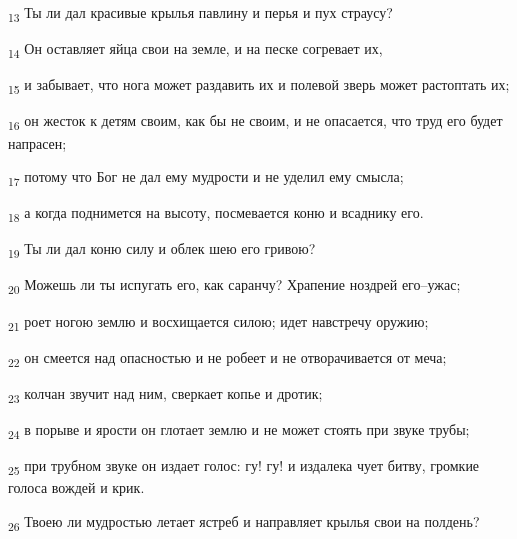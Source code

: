 \begin{tcolorbox}
\textsubscript{13} Ты ли дал красивые крылья павлину и перья и пух страусу?
\end{tcolorbox}
\begin{tcolorbox}
\textsubscript{14} Он оставляет яйца свои на земле, и на песке согревает их,
\end{tcolorbox}
\begin{tcolorbox}
\textsubscript{15} и забывает, что нога может раздавить их и полевой зверь может растоптать их;
\end{tcolorbox}
\begin{tcolorbox}
\textsubscript{16} он жесток к детям своим, как бы не своим, и не опасается, что труд его будет напрасен;
\end{tcolorbox}
\begin{tcolorbox}
\textsubscript{17} потому что Бог не дал ему мудрости и не уделил ему смысла;
\end{tcolorbox}
\begin{tcolorbox}
\textsubscript{18} а когда поднимется на высоту, посмевается коню и всаднику его.
\end{tcolorbox}
\begin{tcolorbox}
\textsubscript{19} Ты ли дал коню силу и облек шею его гривою?
\end{tcolorbox}
\begin{tcolorbox}
\textsubscript{20} Можешь ли ты испугать его, как саранчу? Храпение ноздрей его--ужас;
\end{tcolorbox}
\begin{tcolorbox}
\textsubscript{21} роет ногою землю и восхищается силою; идет навстречу оружию;
\end{tcolorbox}
\begin{tcolorbox}
\textsubscript{22} он смеется над опасностью и не робеет и не отворачивается от меча;
\end{tcolorbox}
\begin{tcolorbox}
\textsubscript{23} колчан звучит над ним, сверкает копье и дротик;
\end{tcolorbox}
\begin{tcolorbox}
\textsubscript{24} в порыве и ярости он глотает землю и не может стоять при звуке трубы;
\end{tcolorbox}
\begin{tcolorbox}
\textsubscript{25} при трубном звуке он издает голос: гу! гу! и издалека чует битву, громкие голоса вождей и крик.
\end{tcolorbox}
\begin{tcolorbox}
\textsubscript{26} Твоею ли мудростью летает ястреб и направляет крылья свои на полдень?
\end{tcolorbox}
